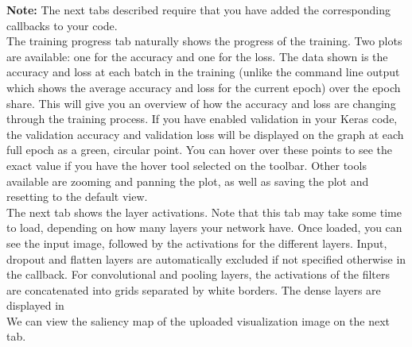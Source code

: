 
\noindent \textbf{Note: }The next tabs described require that you have added the corresponding callbacks to your code. \\ %

\noindent The training progress tab naturally shows the progress of the training. Two plots are available: one for the accuracy and one for the loss. The data shown is the accuracy and loss at each batch in the training (unlike the command line output which shows the average accuracy and loss for the current epoch) over the epoch share. This will give you an overview of how the accuracy and loss are changing through the training process. If you have enabled validation in your Keras code, the validation accuracy and validation loss will be displayed on the graph at each full epoch as a green, circular point. You can hover over these points to see the exact value if you have the hover tool selected on the toolbar. Other tools available are zooming and panning the plot, as well as saving the plot and resetting to the default view. \\


\noindent The next tab shows the layer activations. Note that this tab may take some time to load, depending on how many layers your network have. Once loaded, you can see the input image, followed by the activations for the different layers. Input, dropout and flatten layers are automatically excluded if not specified otherwise in the callback.  For convolutional and pooling layers, the activations of the filters are concatenated into grids separated by white borders. The dense layers are displayed in  \\%


\noindent We can view the saliency map of the uploaded visualization image on the next tab. 


\cleardoublepage
